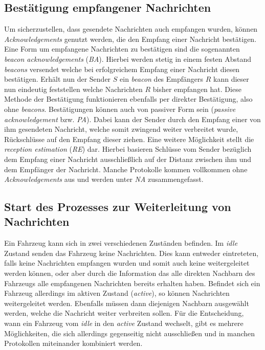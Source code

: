 \documentclass[english,runningheads,a4paper]{llncs}[2018/03/10]
\begin{document}
\subsection{Bestätigung empfangener Nachrichten}
Um sicherzustellen, dass gesendete Nachrichten auch empfangen wurden, können \textit{Acknowledgements} genutzt werden, die den Empfang einer Nachricht bestätigen.
Eine Form um empfangene Nachrichten zu bestätigen sind die sogenannten \textit{beacon acknowledgements} (\textit{BA}).
Hierbei werden stetig in einem festen Abstand \textit{beacons} versendet welche bei erfolgreichem Empfang einer Nachricht diesen bestätigen.
Erhält nun der Sender $S$ ein \textit{beacon} des Empfängers $R$ kann dieser nun eindeutig feststellen welche Nachrichten $R$ bisher empfangen hat.
Diese Methode der Bestätigung funktionieren ebenfalls per direkter Bestätigung, also ohne \textit{beacons}.
Bestätigungen können auch von passiver Form sein (\textit{passive acknowledgement} bzw. \textit{PA}).
Dabei kann der Sender durch den Empfang einer von ihm gesendeten Nachricht, welche somit zwingend weiter verbreitet wurde, Rückschlüsse auf den Empfang dieser ziehen.
Eine weitere Möglichkeit stellt die \textit{reception estimation} (\textit{RE}) dar.
Hierbei basieren Schlüsse vom Sender bezüglich dem Empfang einer Nachricht ausschließlich auf der Distanz zwischen ihm und dem Empfänger der Nachricht.
Manche Protokolle kommen vollkommen ohne \textit{Acknowledgements} aus und werden unter \textit{NA} zusammengefasst.

\subsection{Start des Prozesses zur Weiterleitung von Nachrichten}\label{subsec:forwarder-selection}
Ein Fahrzeug kann sich in zwei verschiedenen Zuständen befinden.
Im \textit{idle} Zustand senden das Fahrzeug keine Nachrichten.
Dies kann entweder eintreteten, falls keine Nachrichten empfangen wurden und somit auch keine weitergeleitet werden können, oder aber durch die Information das alle direkten Nachbarn des Fahrzeugs alle empfangenen Nachrichten bereits erhalten haben.
Befindet sich ein Fahrzeug allerdings im aktiven Zustand (\textit{active}), so können Nachrichten weitergeleitet werden.
Ebenfalls müssen dann diejenigen Nachbarn ausgewählt werden, welche die Nachricht weiter verbreiten sollen.
Für die Entscheidung, wann ein Fahrzeug vom \textit{idle} in den \textit{active} Zustand wechselt, gibt es mehrere Möglichkeiten, die sich allerdings gegenseitig nicht ausschließen und in manchen Protokollen miteinander kombiniert werden.
\end{document}
